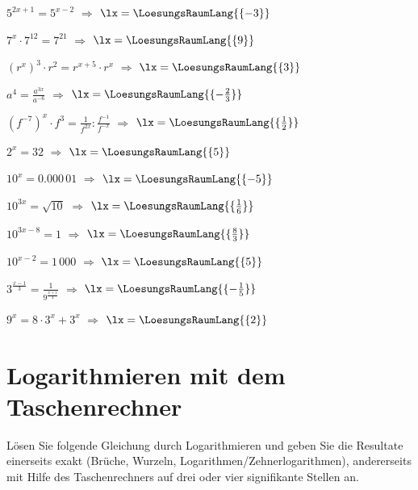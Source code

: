 \begin{bbwAufgabenBlock}
\item $5^{2x+1} = 5^{x-2}$                        $\Longrightarrow$ $\lx=\LoesungsRaumLang{\{-3\}}$ 
\item $7^x \cdot 7^{12} = 7^{21}$                 $\Longrightarrow$ $\lx=\LoesungsRaumLang{\{9\}}$ \noTRAINER{\seitenUmbruchImAufgabenteil{}}
\item $(r^x)^3 \cdot{} r^2 = r^{x+5} \cdot{} r^x$ $\Longrightarrow$ $\lx=\LoesungsRaumLang{\{3\}}$ 
\item $a^4 = \frac{a^{3x}}{a^{-6}}$ $\Longrightarrow$ $\lx=\LoesungsRaumLang{\{-\frac23\}}$ \noTRAINER{\seitenUmbruchImAufgabenteil{}}
\item $(f^{-7})^x \cdot{} f^3 = \frac{1}{f^{2x}} : \frac{f^{-1}}{f^{-x}}$ $\Longrightarrow$ $\lx=\LoesungsRaumLang{\{\frac12\}}$ 
\item $2^x=32$ $\Longrightarrow$ $\lx=\LoesungsRaumLang{\{5\}}$ \noTRAINER{\seitenUmbruchImAufgabenteil{}}
\item $10^x=0.000\,01$ $\Longrightarrow$ $\lx=\LoesungsRaumLang{\{-5\}}$ 
\item $10^{3x}=\sqrt{10}$ $\Longrightarrow$ $\lx=\LoesungsRaumLang{\{\frac16\}}$ \noTRAINER{\seitenUmbruchImAufgabenteil{}}
\item $10^{3x-8}=1$ $\Longrightarrow$ $\lx=\LoesungsRaumLang{\{\frac83\}}$ 
\item $10^{x-2}=1\,000$ $\Longrightarrow$ $\lx=\LoesungsRaumLang{\{5\}}$ \noTRAINER{\seitenUmbruchImAufgabenteil{}}

\item $3^{\frac{x-1}{3}} = \frac1{9^{\frac{x+1}{4}}}$ $\Longrightarrow$ $\lx=\LoesungsRaumLang{\{-\frac15\}}$ 
\item $9^x = 8\cdot{}3^x + 3^x$ $\Longrightarrow$ $\lx=\LoesungsRaumLang{\{2\}}$ 
\end{bbwAufgabenBlock}
\newpage
%
%
\section{Logarithmieren mit dem Taschenrechner}
Lösen Sie folgende Gleichung durch Logarithmieren und geben Sie die
Resultate einerseits exakt (Brüche, Wurzeln, Logarithmen/Zehnerlogarithmen), andererseits mit
Hilfe des Taschenrechners auf drei oder vier signifikante Stellen an.

